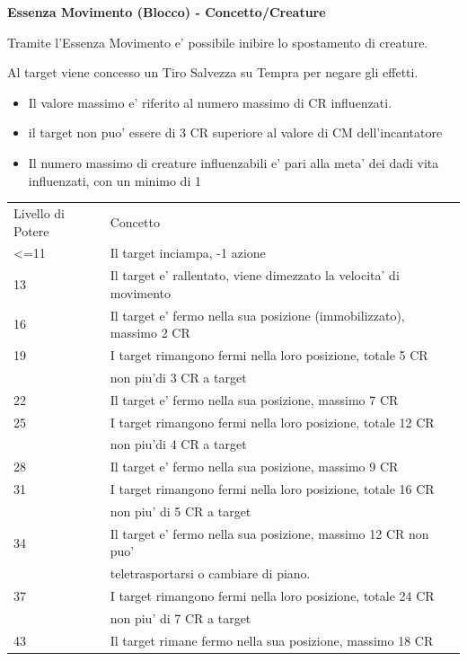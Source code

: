 \documentclass[a4paper,11pt,twoside,openany]{dndbook}
\begin{document}
\bigskip

\textbf{Essenza Movimento (Blocco) - Concetto/Creature}

Tramite l'Essenza Movimento e' possibile inibire lo spostamento di creature.

Al target viene concesso un Tiro Salvezza su Tempra per negare gli effetti.
\begin{itemize}
\item 
Il valore massimo e' riferito al numero massimo di CR influenzati. 
\item 
il target non puo' essere di 3 CR superiore al valore di CM dell'incantatore 
\item 
Il numero massimo di creature influenzabili e' pari alla meta' dei
dadi vita influenzati, con un minimo di 1 
\end{itemize}

\bigskip

\begin{tabular}[c]{@{}ll@{}}
\toprule 
Livello di Potere & Concetto\tabularnewline
\textless=11 & Il target inciampa, -1 azione\tabularnewline
13 & Il target e' rallentato, viene dimezzato la velocita' di movimento\tabularnewline
16 & Il target e' fermo nella sua posizione (immobilizzato), massimo 2
CR\tabularnewline
19 & I target rimangono fermi nella loro posizione, totale 5 CR\\
& non piu'di 3 CR a target\tabularnewline
22 & Il target e' fermo nella sua posizione, massimo 7 CR\tabularnewline
25 & I target rimangono fermi nella loro posizione, totale 12 CR\\
&non piu'di 4 CR a target\tabularnewline
28 & Il target e' fermo nella sua posizione, massimo 9 CR\tabularnewline
31 & I target rimangono fermi nella loro posizione, totale 16 CR\\
&non piu' di 5 CR a target\tabularnewline
34 & Il target e' fermo nella sua posizione, massimo 12 CR non puo'\\ &teletrasportarsi o cambiare di piano.\tabularnewline
37 & I target rimangono fermi nella loro posizione, totale 24 CR\\
&non piu' di 7 CR a target\tabularnewline
43 & Il target rimane fermo nella sua posizione, massimo 18 CR\tabularnewline
\bottomrule
\end{tabular}
\end{document}
